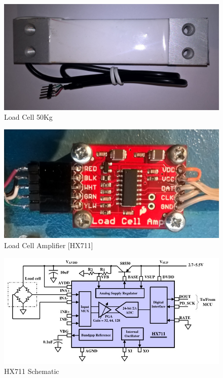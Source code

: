 \begin{figure}[H]
	\captionsetup{justification=raggedright,singlelinecheck=false}
	\flushleft
	\includegraphics[scale=0.20]{./image/PESTA/material/Load_Cell_1.jpg}
	\caption{Load Cell 50Kg}
	\label{Load_Cell_1}
\end{figure}

\begin{figure}[H]
	\captionsetup{justification=raggedright,singlelinecheck=false}
	\flushleft
	\includegraphics[scale=0.10]{./image/PESTA/material/HX711_board_1.jpg}
	\caption{Load Cell Amplifier [HX711]}
	\label{HX711_board_1}
\end{figure}

\begin{figure}[H]
	\captionsetup{justification=raggedright,singlelinecheck=false}
	\flushleft
	\includegraphics[scale=0.70]{./image/PESTA/schematic/HX711_Schematic_1.jpg}
	\caption{HX711 Schematic}
	\label{HX711_Schematic_1}
\end{figure}
